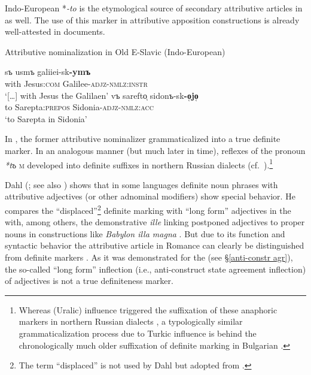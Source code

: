 {
Indo-European *\textit{-to} is the etymological source of secondary attributive articles in  as well. The use of this marker in attributive apposition constructions is already well-attested in  documents.
\begin{exe}
\ex \rm{Attributive nominalization in Old E-Slavic (Indo-European)}
\begin{xlist}
\ex
\gll	[\dots] sъ usmъ galiiei-sk\textbf{-ymъ}\\
	{ } with Jesus:\textsc{com} Galilee-\textsc{adjz}-\textsc{nmlz:instr}\\
\glt 	‘[\dots] with Jesus the Galilaen’ \citep[Matthew 26, cit.][214]{mendoza2004}
\ex 
\gll	vъ sarefto̜ sidonъ-sk\textbf{-o̜jo̜}\\
	to Sarepta:\textsc{prepos} Sidonia-\textsc{adjz}-\textsc{nmlz:acc}\\
\glt 	‘to Sarepta in Sidonia’ \citep[Luke 4, cit.][214]{mendoza2004}
\end{xlist}
\end{exe}
In , the former attributive nominalizer grammaticalized into a true definite marker. In an analogous manner (but much later in time), reflexes of the  pronoun \textit{*tъ} \textsc{m} developed into definite suffixes in northern Russian dialects (cf.~\citealt
{leinonen2006a}).\footnote{Whereas  (Uralic) influence triggered the suffixation of these anaphoric markers in northern Russian dialects \citep
{leinonen2006a}, a typologically similar grammaticalization process due to Turkic influence is behind the chronologically much older suffixation of definite marking in Bulgarian \citep[114–122]{kusmenko2008}.}

Dahl (\citeyear[149–152]{dahl2003}; see also \citealt[122–123]{dahl2015a}) shows that in some languages definite noun phrases with attributive adjectives (or other adnominal modifiers) show special behavior. He compares the “displaced”\footnote{The term “displaced” is not used by Dahl but adopted from \citet[114–116]{melcuk2006}.} definite marking with “long form” adjectives in the  with, among others, the demonstrative \textit{ille} linking postponed adjectives to proper nouns in  constructions like \textit{Babylon illa magna} \cite[150]{dahl2003}. But due to its function and syntactic behavior the attributive article in Romance can clearly be distinguished from definite markers \citep[329]{gamillscheg1937}. As it was demonstrated for the  (see \S\ref{anti-constr agr}), the so-called “long form” inflection (i.e., anti\hyp{}construct state agreement inflection) of adjectives is not a true definiteness marker.

}
